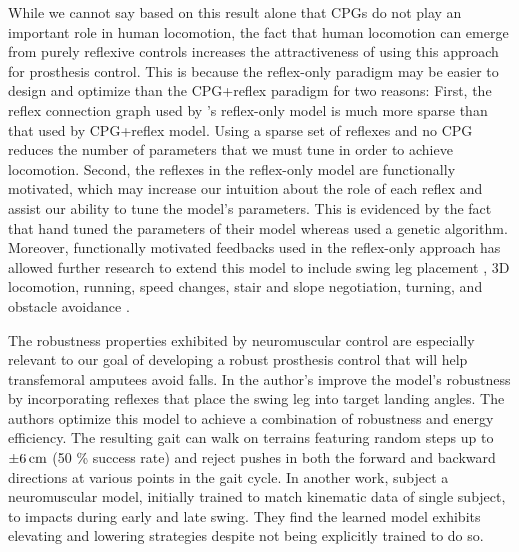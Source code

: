 While we cannot say based on this result alone that CPGs do not play an
important role in human locomotion, the fact that human locomotion can emerge
from purely reflexive controls increases the attractiveness of using this
approach for prosthesis control. This is because the reflex-only paradigm may be
easier to design and optimize than the CPG+reflex paradigm for two reasons:
First, the reflex connection graph used by \citet{geyer2010muscle}'s reflex-only
model is much more sparse than that used by \citet{ogihara2001generation}
CPG+reflex model. Using a sparse set of reflexes and no CPG reduces the number of
parameters that we must tune in order to achieve locomotion. Second, the
reflexes in the reflex-only model are functionally motivated, which may increase
our intuition about the role of each reflex and assist our ability to tune the
model's parameters. This is evidenced by the fact that
\citeauthor{geyer2010muscle} hand tuned the parameters of their model whereas
\citeauthor{ogihara2001generation} used a genetic algorithm.  Moreover,
functionally motivated feedbacks used in the reflex-only approach has allowed
further research to extend this model to include swing leg placement
\citep{desai2013muscle}, 3D locomotion, running, speed changes, stair and slope
negotiation, turning, and obstacle avoidance \citep{song2015neural}.  

The robustness properties exhibited by neuromuscular control are especially
relevant to our goal of developing a robust prosthesis control that will help
transfemoral amputees avoid falls. In \citet{song2015neural} the author's
improve the model's robustness by incorporating reflexes that place the swing leg
into target landing angles. The authors optimize this model to achieve a
combination of robustness and energy efficiency.  The resulting gait can walk on
terrains featuring random steps up to $\unit[\pm 6]{cm}$ (50 \% success rate)
and reject pushes in both the forward and backward directions at various points
in the gait cycle. In another work, \citet{murai2011neuromuscular} subject a
neuromuscular model, initially trained to match kinematic data of single
subject, to impacts during early and late swing. They find the learned model
exhibits elevating and lowering strategies despite not being explicitly trained
to do so.

